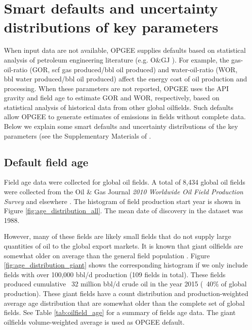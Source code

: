 \documentclass[11pt]{report}
\begin{document}
\clearpage

\section{Smart defaults and uncertainty distributions of key parameters}
\label{sec:smart_defaults}

When input data are not available, OPGEE supplies defaults based on statistical analysis of petroleum engineering literature (e.g. O\&GJ \cite{OGJ2009a}). For example, the gas-oil-ratio (GOR, scf gas produced/bbl oil produced) and water-oil-ratio (WOR, bbl water produced/bbl oil produced) affect the energy cost of oil production and processing. When these parameters are not reported, OPGEE uses the API gravity and field age to estimate GOR and WOR, respectively, based on statistical analysis of historical data from other global oilfields. Such defaults allow OPGEE to generate estimates of emissions in fields without complete data. Below we explain some smart defaults and uncertainty distributions of the key parameters (see the Supplementary Materials of \cite{masnadi2018global}. 

\subsection{Default field age}

Field age data were collected for global oil fields. A total of 8,434 global oil fields were collected from the Oil \& Gas Journal \emph{2010 Worldwide Oil Field Production Survey} \cite{OGJ2009a} and elsewhere \cite{masnadi2018global}. The histogram of field production start year is shown in Figure \ref{fig:age_distribution_all}. The mean date of discovery in the dataset was 1988.

 However, many of these fields are likely small fields that do not supply large quantities of oil to the global export markets. It is known that giant oilfields are somewhat older on average than the general field population \cite{Simmons2005, Simmons2006, Deffeyes2001, Deffeyes2005}. Figure \ref{fig:age_distribution_giant} shows the corresponding histogram if we only include fields with over 100,000 bbl/d production (109 fields in total). These fields produced cumulative ~32 million bbl/d crude oil in the year 2015 (~40\% of global production). These giant fields have a count distribution and production-weighted average age distribution that are somewhat older than the complete set of global fields. See Table \ref{tab:oilfield_age} for a summary of fields age data. The giant oilfields volume-weighted average is used as OPGEE default. 
 
\end{document}
